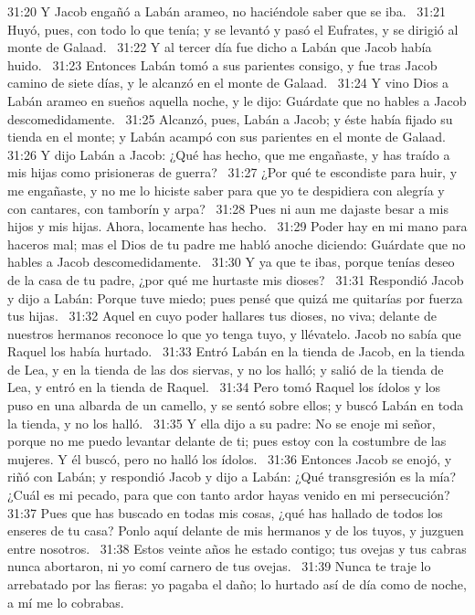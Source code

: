 31:20 Y Jacob engañó a Labán arameo, no haciéndole saber que se iba.  
31:21 Huyó, pues, con todo lo que tenía; y se levantó y pasó el Eufrates, y se dirigió al monte de Galaad.  
31:22 Y al tercer día fue dicho a Labán que Jacob había huido.  
31:23 Entonces Labán tomó a sus parientes consigo, y fue tras Jacob camino de siete días, y le alcanzó en el monte de Galaad.  
31:24 Y vino Dios a Labán arameo en sueños aquella noche, y le dijo: Guárdate que no hables a Jacob descomedidamente.  
31:25 Alcanzó, pues, Labán a Jacob; y éste había fijado su tienda en el monte; y Labán acampó con sus parientes en el monte de Galaad.  
31:26 Y dijo Labán a Jacob: ¿Qué has hecho, que me engañaste, y has traído a mis hijas como prisioneras de guerra?  
31:27 ¿Por qué te escondiste para huir, y me engañaste, y no me lo hiciste saber para que yo te despidiera con alegría y con cantares, con tamborín y arpa?  
31:28 Pues ni aun me dajaste besar a mis hijos y mis hijas. Ahora, locamente has hecho.  
31:29 Poder hay en mi mano para haceros mal; mas el Dios de tu padre me habló anoche diciendo: Guárdate que no hables a Jacob descomedidamente.  
31:30 Y ya que te ibas, porque tenías deseo de la casa de tu padre, ¿por qué me hurtaste mis dioses?  
31:31 Respondió Jacob y dijo a Labán: Porque tuve miedo; pues pensé que quizá me quitarías por fuerza tus hijas.  
31:32 Aquel en cuyo poder hallares tus dioses, no viva; delante de nuestros hermanos reconoce lo que yo tenga tuyo, y llévatelo. Jacob no sabía que Raquel los había hurtado.  
31:33 Entró Labán en la tienda de Jacob, en la tienda de Lea, y en la tienda de las dos siervas, y no los halló; y salió de la tienda de Lea, y entró en la tienda de Raquel.  
31:34 Pero tomó Raquel los ídolos y los puso en una albarda de un camello, y se sentó sobre ellos; y buscó Labán en toda la tienda, y no los halló.  
31:35 Y ella dijo a su padre: No se enoje mi señor, porque no me puedo levantar delante de ti; pues estoy con la costumbre de las mujeres. Y él buscó, pero no halló los ídolos.  
31:36 Entonces Jacob se enojó, y riñó con Labán; y respondió Jacob y dijo a Labán: ¿Qué transgresión es la mía? ¿Cuál es mi pecado, para que con tanto ardor hayas venido en mi persecución?  
31:37 Pues que has buscado en todas mis cosas, ¿qué has hallado de todos los enseres de tu casa? Ponlo aquí delante de mis hermanos y de los tuyos, y juzguen entre nosotros.  
31:38 Estos veinte años he estado contigo; tus ovejas y tus cabras nunca abortaron, ni yo comí carnero de tus ovejas.  
31:39 Nunca te traje lo arrebatado por las fieras: yo pagaba el daño; lo hurtado así de día como de noche, a mí me lo cobrabas.  
